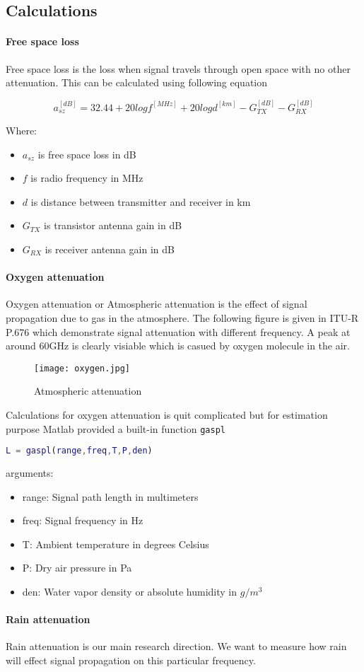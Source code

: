 \newpage
\subsection{Calculations}
\paragraph{Free space loss}
Free space loss is the loss when signal travels through open space with no
other attenuation. This can be calculated using following equation \cite{openspace}

\begin{equation}
    a_{sz}^{[dB]} = 32.44 + 20log f^{[MHz]}+20log d^{[km]} - G_{TX}^{[dB]} - G_{RX}^{[dB]}
    \label{eq:openspace}
\end{equation}

Where:
\begin{itemize}
    \item $a_{sz}$ is free space loss in dB
    \item $f$ is radio frequency in MHz
    \item $d$ is distance between transmitter and receiver in km 
    \item $G_{TX}$ is transistor antenna gain in dB
    \item $G_{RX}$ is receiver antenna gain in dB
\end{itemize}
\paragraph{Oxygen attenuation}
Oxygen attenuation or Atmospheric attenuation is the effect of signal propagation due to
gas in the atmosphere. The following figure is given in ITU-R P.676 \cite{oxygen} which
demonstrate signal attenuation with different frequency. A peak at around 60GHz is 
clearly visiable which is casued by oxygen molecule in the air.

\begin{figure}[h!]
    \centering
    \texttt{[image: oxygen.jpg]}
    \caption{Atmospheric attenuation}
    \label{fig:Atmospheric attenuation}
\end{figure}

Calculations for oxygen attenuation is quit complicated but for estimation 
purpose Matlab provided a built-in function \verb|gaspl|

\begin{lstlisting}[language=Matlab]
    L = gaspl(range,freq,T,P,den)
\end{lstlisting}
arguments:
\begin{itemize}
    \item range: Signal path length in multimeters
    \item freq: Signal frequency in Hz
    \item T: Ambient temperature in degrees Celsius
    \item P: Dry air pressure in Pa 
    \item den: Water vapor density or absolute humidity in $g/m^3$
\end{itemize}

\paragraph{Rain attenuation}
Rain attenuation is our main research direction. We want to measure how
rain will effect signal propagation on this particular frequency.